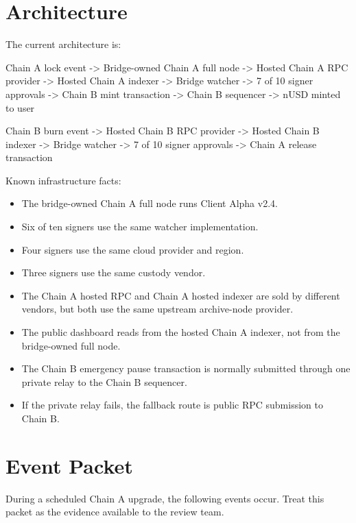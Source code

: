 \section*{Architecture}

The current architecture is:

\begin{codeblock}
Chain A lock event
    -> Bridge-owned Chain A full node
    -> Hosted Chain A RPC provider
    -> Hosted Chain A indexer
    -> Bridge watcher
    -> 7 of 10 signer approvals
    -> Chain B mint transaction
    -> Chain B sequencer
    -> nUSD minted to user

Chain B burn event
    -> Hosted Chain B RPC provider
    -> Hosted Chain B indexer
    -> Bridge watcher
    -> 7 of 10 signer approvals
    -> Chain A release transaction
\end{codeblock}

Known infrastructure facts:

\begin{itemize}
\item The bridge-owned Chain A full node runs Client Alpha v2.4.
\item Six of ten signers use the same watcher implementation.
\item Four signers use the same cloud provider and region.
\item Three signers use the same custody vendor.
\item The Chain A hosted RPC and Chain A hosted indexer are sold by different vendors, but both use the same upstream archive-node provider.
\item The public dashboard reads from the hosted Chain A indexer, not from the bridge-owned full node.
\item The Chain B emergency pause transaction is normally submitted through one private relay to the Chain B sequencer.
\item If the private relay fails, the fallback route is public RPC submission to Chain B.
\end{itemize}

\section*{Event Packet}

During a scheduled Chain A upgrade, the following events occur. Treat this packet as the evidence available to the review team.

